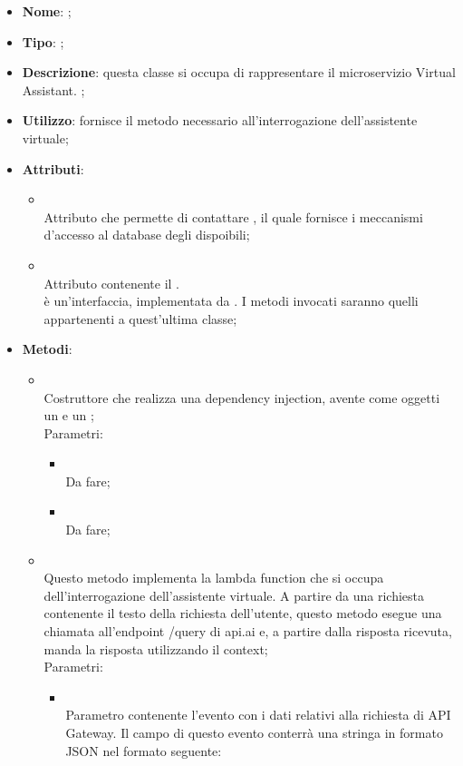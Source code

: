 \begin{itemize}
	\item \textbf{Nome}: ;
	\item \textbf{Tipo}: ;
	\item \textbf{Descrizione}: questa classe si occupa di rappresentare il microservizio Virtual Assistant. ;
	\item \textbf{Utilizzo}: fornisce il metodo necessario all'interrogazione dell'assistente virtuale;
	\item \textbf{Attributi}:
	\begin{itemize}
		\item[]  \\
		Attributo che permette di contattare , il quale fornisce i meccanismi d'accesso al database degli  dispoibili;
		\item[]  \\
		Attributo contenente il . \\
 è un'interfaccia, implementata da .  I metodi invocati saranno quelli appartenenti a quest'ultima classe;
	\end{itemize}
	\item \textbf{Metodi}:
	\begin{itemize}
		\item[]  \\
		Costruttore che realizza una dependency injection, avente come oggetti un  e un ;\\
		Parametri:
		\begin{itemize}
			\item {} \\
			Da fare;
			\item {} \\
			Da fare;
		\end{itemize}
		\item[]  \\
		Questo metodo implementa la lambda function che si occupa dell'interrogazione dell'assistente virtuale. A partire da una richiesta contenente il testo della richiesta dell'utente, questo metodo esegue una chiamata all'endpoint /query di api.ai e, a partire dalla risposta ricevuta, manda la risposta utilizzando il context;\\
		Parametri:
		\begin{itemize}
			\item {} \\
			Parametro contenente l'evento con i dati relativi alla richiesta di API Gateway. Il campo  di questo evento conterrà una stringa in formato JSON nel formato seguente:


\end{itemize}
\end{itemize}
\end{itemize}
